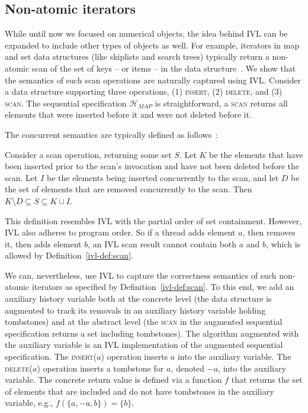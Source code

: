 \subsection{Non-atomic iterators}
\label{ivl-ssec:sets-and-iterators}

While until now we focused on numerical objects, the idea behind IVL can be
expanded to include other types of objects as well. For example, iterators
in map and set data structures (like skiplists and search trees) typically return a
non-atomic scan of the set of keys -- or items -- in the data structure~\cite{arbel2018harnessing, meir2020oak}.
We show that the semantics of such scan operations are naturally captured using IVL.
Consider a data structure supporting three operations, (1) \textsc{insert}, (2) \textsc{delete},
and (3) \textsc{scan}.
The sequential specification $\mathcal{H}_{MAP}$ is straightforward, a \textsc{scan}
returns all elements that were inserted before it and were not deleted before it.

The concurrent semantics are typically defined as follows~\cite{arbel2018harnessing, meir2020oak}:
\begin{definition}
Consider a scan operation, returning some set $S$. Let $K$ be the elements that have
been inserted prior to the scan's invocation and have not been deleted before the scan. Let
$I$ be the elements being inserted concurrently to the scan, and let $D$ be the set of elements
that are removed concurrently to the scan. Then $K \setminus D \subseteq S \subseteq K \cup I$.
\label{ivl-def:scan}
\end{definition}

This definition resembles IVL with the partial order of set containment. However, IVL also
adheres to program order. So if a thread adds element $a$, then removes it, then 
adds element $b$, an IVL scan result cannot contain both $a$ and $b$, which is allowed
by Definition~\ref{ivl-def:scan}.

We can, nevertheless, use IVL to capture the correctness semantics of such non-atomic
iterators as specified by Definition~\ref{ivl-def:scan}.
To this end, we add an auxiliary history variable both at the concrete level
(the data structure is augmented to track its removals in an auxiliary history variable holding
tombstones) and at the abstract level (the \textsc{scan} in the augmented sequential
specification returns a set including tombstones).
The algorithm augmented
with the auxiliary variable is an IVL implementation of the augmented sequential specification.  
The \textsc{insert}($a$) operation inserts $a$ into the auxiliary variable.
The \textsc{delete}($a$) operation inserts a tombstone for $a$, denoted $-a$, into the auxiliary variable. The
concrete return value is defined via a function $f$ that returns the
set of elements that are included and do not have tombstones in the
auxiliary variable, e.g., $f(\{a,-a,b\}) = \{b\}$.

